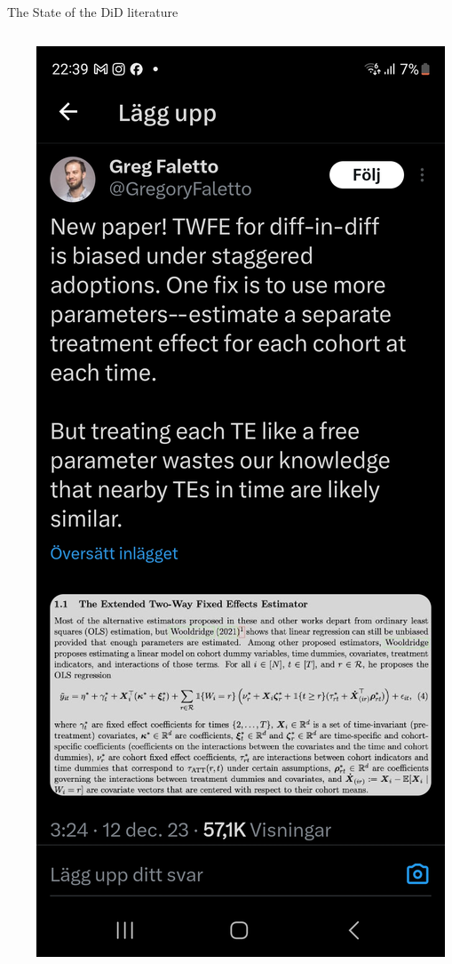 \documentclass[notes,11pt, aspectratio=169]{beamer}
\newenvironment{wideitemize}{\itemize\addtolength{\itemsep}{10pt}}{\enditemize}
\begin{document}
\begin{frame}{The State of the DiD literature}
\begin{columns}[T]
\begin{column}{.6\textwidth}
\begin{wideitemize}
      \end{wideitemize}
    \end{column}%
    \hfill%
    \begin{column}{.4\textwidth}
       \includegraphics[width=0.8\linewidth]{1000004356.jpg}                 
    \end{column}%
  \end{columns}
\end{frame}
\end{document}
